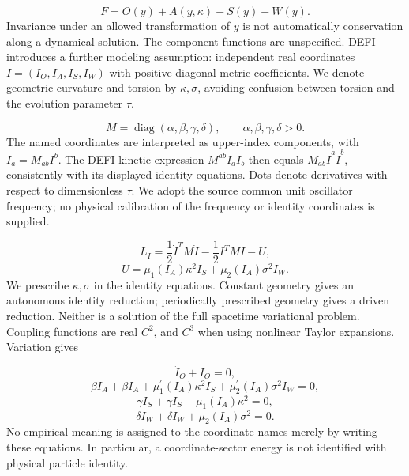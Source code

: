 \documentclass[aip,adv,preprint,floatfix]{revtex4-2}
\begin{document}
\begin{equation}
F=O(y)+A(y,\kappa)+S(y)+W(y).
\end{equation}
Invariance under an allowed transformation of $y$ is not automatically conservation along a dynamical solution. The component functions are unspecified. DEFI introduces a further modeling assumption: independent real coordinates $I=(I_O,I_A,I_S,I_W)$ with positive diagonal metric coefficients. We denote geometric curvature and torsion by $\kappa,\sigma$, avoiding confusion between torsion and the evolution parameter $\tau$.

\begin{equation}
M=\operatorname{diag}(\alpha,\beta,\gamma,\delta),\qquad \alpha,\beta,\gamma,\delta>0.
\end{equation}
The named coordinates are interpreted as upper-index components, with $I_a=M_{ab}I^b$. The DEFI kinetic expression \cite{r6} $M^{ab}\dot I_a\dot I_b$ then equals $M_{ab}\dot I^a\dot I^b$, consistently with its displayed identity equations. Dots denote derivatives with respect to dimensionless $\tau$. We adopt the source common unit oscillator frequency; no physical calibration of the frequency or identity coordinates is supplied.

\begin{equation}
L_I=\frac12\dot I^T M\dot I-\frac12I^TMI-U,
\end{equation}
\begin{equation}
U=\mu_1(I_A)\kappa^2I_S+\mu_2(I_A)\sigma^2I_W.
\end{equation}
We prescribe $\kappa,\sigma$ in the identity equations. Constant geometry gives an autonomous identity reduction; periodically prescribed geometry gives a driven reduction. Neither is a solution of the full spacetime variational problem. Coupling functions are real $C^2$, and $C^3$ when using nonlinear Taylor expansions. Variation gives

\begin{equation}
\ddot I_O+I_O=0,
\end{equation}
\begin{equation}
\beta\ddot I_A+\beta I_A+\mu_1^\prime(I_A)\kappa^2I_S+\mu_2^\prime(I_A)\sigma^2I_W=0,
\end{equation}
\begin{equation}
\gamma\ddot I_S+\gamma I_S+\mu_1(I_A)\kappa^2=0,
\end{equation}
\begin{equation}
\delta\ddot I_W+\delta I_W+\mu_2(I_A)\sigma^2=0.
\end{equation}
No empirical meaning is assigned to the coordinate names merely by writing these equations. In particular, a coordinate-sector energy is not identified with physical particle identity.
\end{document}
